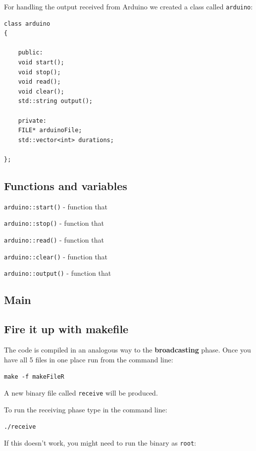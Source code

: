\documentclass[12pt]{report}
\begin{document}
For handling the output received from Arduino we created a class called \verb|arduino|:

\begin{lstlisting}
class arduino
{

	public:
	void start();
	void stop();
	void read();
	void clear();
	std::string output();

	private:
	FILE* arduinoFile;
	std::vector<int> durations;
	
};
\end{lstlisting}

\subsection{Functions and variables}

\verb|arduino::start()| - function that 

\verb|arduino::stop()| - function that 

\verb|arduino::read()| - function that 

\verb|arduino::clear()| - function that 

\verb|arduino::output()| - function that 





\subsection{Main}


\subsection{Fire it up with makefile}

The code is compiled in an analogous way to the \textbf{broadcasting} phase. Once you have all 5 files in one place run from the command line:

\begin{snugshade}
\verb|make -f makeFileR|
\end{snugshade}

A new binary file called \verb|receive| will be produced.

To run the receiving phase type in the command line:

\begin{snugshade}
\verb|./receive|
\end{snugshade}

If this doesn't work, you might need to run the binary as \verb|root|:
\end{document}
